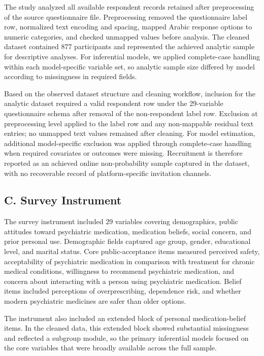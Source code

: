 The study analyzed all available respondent records retained after
preprocessing of the source questionnaire file. Preprocessing removed
the questionnaire label row, normalized text encoding and spacing,
mapped Arabic response options to numeric categories, and checked
unmapped values before analysis. The cleaned dataset contained 877
participants and represented the achieved analytic sample for
descriptive analyses. For inferential models, we applied complete-case
handling within each model-specific variable set, so analytic sample
size differed by model according to missingness in required fields.

Based on the observed dataset structure and cleaning workflow, inclusion
for the analytic dataset required a valid respondent row under the
29-variable questionnaire schema after removal of the non-respondent
label row. Exclusion at preprocessing level applied to the label row and
any non-mappable residual text entries; no unmapped text values remained
after cleaning. For model estimation, additional model-specific
exclusion was applied through complete-case handling when required
covariates or outcomes were missing. Recruitment is therefore reported
as an achieved online non-probability sample captured in the dataset,
with no recoverable record of platform-specific invitation channels.

\subsection{C. Survey Instrument}\label{c.-survey-instrument}

The survey instrument included 29 variables covering demographics,
public attitudes toward psychiatric medication, medication beliefs,
social concern, and prior personal use. Demographic fields captured age
group, gender, educational level, and marital status. Core
public-acceptance items measured perceived safety, acceptability of
psychiatric medication in comparison with treatment for chronic medical
conditions, willingness to recommend psychiatric medication, and concern
about interacting with a person using psychiatric medication. Belief
items included perceptions of overprescribing, dependence risk, and
whether modern psychiatric medicines are safer than older options.

The instrument also included an extended block of personal
medication-belief items. In the cleaned data, this extended block showed
substantial missingness and reflected a subgroup module, so the primary
inferential models focused on the core variables that were broadly
available across the full sample.

